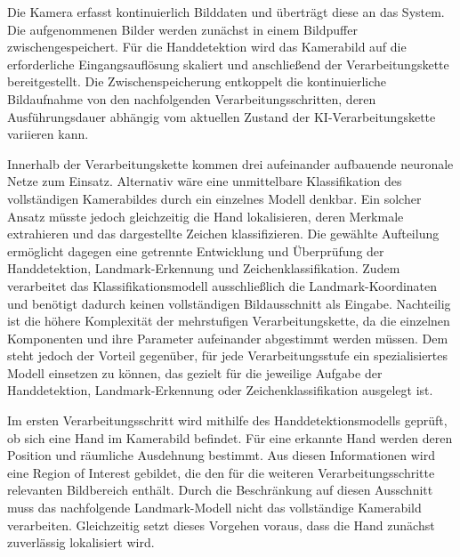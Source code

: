 Die Kamera erfasst kontinuierlich Bilddaten und überträgt diese an das System. Die aufgenommenen Bilder werden zunächst in einem Bildpuffer zwischengespeichert. Für die Handdetektion wird das Kamerabild auf die erforderliche Eingangsauflösung skaliert und anschließend der Verarbeitungskette bereitgestellt. Die Zwischenspeicherung entkoppelt die kontinuierliche Bildaufnahme von den nachfolgenden Verarbeitungsschritten, deren Ausführungsdauer abhängig vom aktuellen Zustand der KI-Verarbeitungskette variieren kann.

Innerhalb der Verarbeitungskette kommen drei aufeinander aufbauende neuronale Netze \linebreak zum Einsatz. Alternativ wäre eine unmittelbare Klassifikation des vollständigen Kamerabildes durch ein einzelnes Modell denkbar. Ein solcher Ansatz müsste jedoch gleichzeitig die Hand lokalisieren, deren Merkmale extrahieren und das dargestellte Zeichen klassifizieren. Die gewählte Aufteilung ermöglicht dagegen eine getrennte Entwicklung und Überprüfung der Handdetektion, Landmark-Erkennung und Zeichenklassifikation. Zudem verarbeitet das Klassifikationsmodell ausschließlich die Landmark-Koordinaten und benötigt dadurch keinen vollständigen Bildausschnitt als Eingabe. Nachteilig ist die höhere Komplexität der mehrstufigen Verarbeitungskette, da die einzelnen Komponenten und ihre Parameter aufeinander abgestimmt werden müssen. Dem steht jedoch der Vorteil gegenüber, für jede Verarbeitungsstufe ein spezialisiertes Modell einsetzen zu können, das gezielt für die jeweilige Aufgabe der Handdetektion, Landmark-Erkennung oder Zeichenklassifikation ausgelegt ist.

Im ersten Verarbeitungsschritt wird mithilfe des Handdetektionsmodells geprüft, ob sich eine Hand im Kamerabild befindet. Für eine erkannte Hand werden deren Position und räumliche Ausdehnung bestimmt. Aus diesen Informationen wird eine Region of Interest gebildet, die den für die weiteren Verarbeitungsschritte relevanten Bildbereich enthält. Durch die Beschränkung auf diesen Ausschnitt muss das nachfolgende Landmark-Modell nicht das vollständige Kamerabild verarbeiten. Gleichzeitig setzt dieses Vorgehen voraus, dass die Hand zunächst zuverlässig lokalisiert wird.

